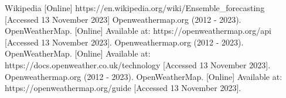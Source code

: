 \documentclass[../paper.tex]{subfiles}
\begin{document}
\begin{thebibliography}{00}
     Wikipedia [Online] https://en.wikipedia.org/wiki/Ensemble\_forecasting [Accessed 13 November 2023]
     Openweathermap.org (2012 - 2023).
    OpenWeatherMap.
    [Online] Available at: https://openweathermap.org/api [Accessed 13 November 2023].
     Openweathermap.org (2012 - 2023).
    OpenWeatherMap.
    [Online] Available at: https://docs.openweather.co.uk/technology [Accessed 13 November 2023].
     Openweathermap.org (2012 - 2023).
    OpenWeatherMap.
    [Online] Available at: https://openweathermap.org/guide [Accessed 13 November 2023].


\end{thebibliography}
\end{document}
